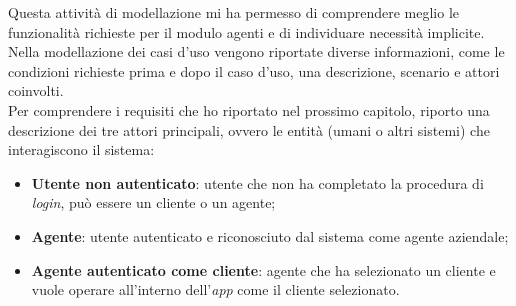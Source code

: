 Questa attività di modellazione mi ha permesso di comprendere meglio le funzionalità richieste per il 
modulo agenti e di individuare necessità implicite.\\
Nella modellazione dei casi d'uso vengono riportate diverse informazioni, come le condizioni richieste prima e dopo 
il caso d'uso, una descrizione, scenario e attori coinvolti.\\
Per comprendere i requisiti che ho riportato nel prossimo capitolo, riporto una descrizione dei tre attori principali, 
ovvero le entità (umani o altri sistemi) che interagiscono il sistema:
\begin{itemize}
    \item \textbf{Utente non autenticato}: utente che non ha completato la procedura di \textit{login}, 
          può essere un cliente o un agente;
    \item \textbf{Agente}: utente autenticato e riconosciuto dal sistema come agente aziendale;
    \item \textbf{Agente autenticato come cliente}: agente che ha selezionato un cliente e vuole operare all'interno dell'\textit{app} 
          come il cliente selezionato.
\end{itemize}

